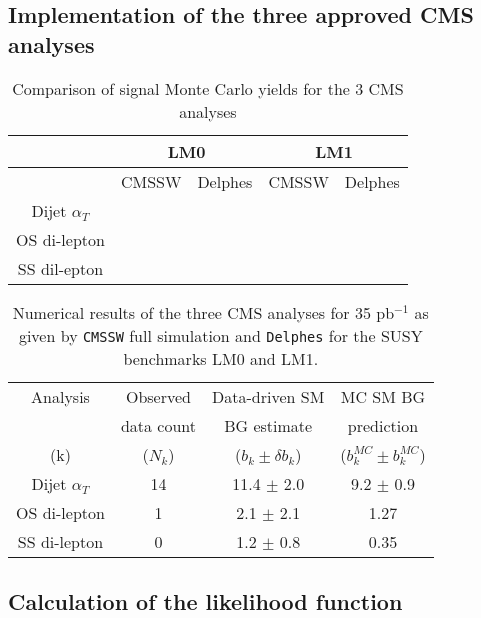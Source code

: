 \subsection{Implementation of the three approved CMS analyses}

\begin{table}[htdp]
\caption{Comparison of signal Monte Carlo yields for the 3 CMS analyses}
\begin{center}
\begin{tabular}{|c|cc|cc|}
\hline
& \multicolumn{2}{|c|}{LM0} & \multicolumn{2}{|c|}{LM1} \\
\hline
& CMSSW & Delphes & CMSSW & Delphes \\
\hline
Dijet $\alpha_T$ & & & & \\
OS di-lepton & & & & \\
SS dil-epton & & & & \\
\hline
\end{tabular}
\end{center}
\label{default}
\end{table}%


\begin{table}[htdp]
\caption{Numerical results of the three CMS analyses for 35 pb$^{-1}$ as given by {\tt CMSSW} full simulation and {\tt Delphes} for the SUSY benchmarks LM0 and LM1.}
\begin{center}
\begin{tabular}{|c|c|c|c|}
\hline
Analysis & Observed  & Data-driven SM & MC SM BG \\
              & data count & BG estimate      & prediction    \\
(k)          & ($N_k$)     & ($b_k \pm \delta b_k$) & ($b_k^{MC} \pm b_k^{MC}$) \\
\hline              
Dijet $\alpha_T$ & 14 & 11.4 $\pm$ 2.0 & 9.2 $\pm$ 0.9 \\
OS di-lepton & 1 & 2.1 $\pm$ 2.1 & 1.27 \\
SS di-lepton & 0 & 1.2 $\pm$ 0.8 & 0.35 \\
\hline
\end{tabular}
\end{center}
\label{default}
\end{table}%



\subsection{Calculation of the likelihood function}

